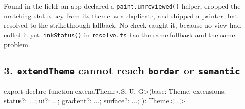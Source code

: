 Found in the field: an app declared a \texttt{p\allowbreak{}a\allowbreak{}i\allowbreak{}n\allowbreak{}t\allowbreak{}.\allowbreak{}u\allowbreak{}n\allowbreak{}r\allowbreak{}e\allowbreak{}v\allowbreak{}i\allowbreak{}e\allowbreak{}w\allowbreak{}e\allowbreak{}d\allowbreak{}(\allowbreak{})} helper, dropped the matching status key from its theme as a duplicate, and shipped a painter that resolved to the strikethrough fallback. No check caught it, because no view had called it yet. \texttt{i\allowbreak{}n\allowbreak{}k\allowbreak{}S\allowbreak{}t\allowbreak{}a\allowbreak{}t\allowbreak{}u\allowbreak{}s\allowbreak{}(\allowbreak{})} in \texttt{r\allowbreak{}e\allowbreak{}s\allowbreak{}o\allowbreak{}l\allowbreak{}v\allowbreak{}e\allowbreak{}.\allowbreak{}t\allowbreak{}s} has the same fallback and the same problem.

\subsection{\texorpdfstring{3. \texttt{e\allowbreak{}x\allowbreak{}t\allowbreak{}e\allowbreak{}n\allowbreak{}d\allowbreak{}T\allowbreak{}h\allowbreak{}e\allowbreak{}m\allowbreak{}e} cannot reach \texttt{b\allowbreak{}o\allowbreak{}r\allowbreak{}d\allowbreak{}e\allowbreak{}r} or \texttt{s\allowbreak{}e\allowbreak{}m\allowbreak{}a\allowbreak{}n\allowbreak{}t\allowbreak{}i\allowbreak{}c}}{3.  cannot reach  or }}\label{record-147-extendtheme-cannot-reach-border-or-semantic}

\begin{CodeBlock}
export declare function extendTheme<S, U, G>(base: Theme, extensions: {
  status?: ...; ui?: ...; gradient?: ...; surface?: ...;
}): Theme<...>
\end{CodeBlock}

